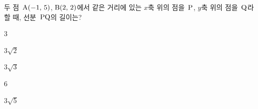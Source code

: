 두 점~$\mathrm{A}(-1,\mkern3mu 5)$, $\mathrm{B}(2,\mkern3mu 2)$에서 같은 거리에 있는 $x$축 위의 점을~$\mathrm{P}$, $y$축 위의 점을~$\mathrm{Q}$라 할 때, 선분~$\mathrm{PQ}$의 길이는?
\begin{choices32}{\rule[-3ex]{0pt}{8ex}$3$}{\rule[-3ex]{0pt}{8ex}$3\sqrt{2}$}{\rule[-3ex]{0pt}{8ex}$3\sqrt{3}$}{\rule[-3ex]{0pt}{8ex}$6$}{\rule[-3ex]{0pt}{8ex}$3\sqrt{5}$}\end{choices32}
